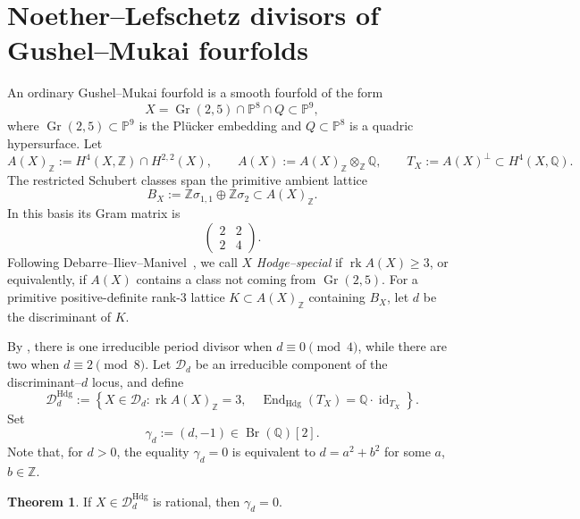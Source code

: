 \documentclass[10pt]{amsart}
\numberwithin{equation}{section}
\theoremstyle{definition}
\newtheorem{theorem}{Theorem}[section]
\theoremstyle{plain}
\numberwithin{theorem}{section}
\def\PP{{\mathbb{P}}}
\def\ZZ{{\mathbb{Z}}}
\newcommand{\Q}{\mathbb{Q}}
\newcommand{\Z}{\mathbb{Z}}
\newcommand{\Gr}{\operatorname{Gr}}
\begin{document}
\section{Noether--Lefschetz divisors of Gushel--Mukai fourfolds} 
An ordinary Gushel--Mukai fourfold is a smooth fourfold of the form
\[
X=\Gr(2,5)\cap\PP^8\cap Q\subset\PP^9,
\]
where $\Gr(2,5)\subset\PP^9$ is the Pl\"ucker embedding and
$Q\subset\PP^8$ is a quadric hypersurface. Let
\[
A(X)_\Z:=H^4(X,\Z)\cap H^{2,2}(X),
\qquad
A(X) := A(X)_\ZZ \otimes_{\Z} \Q, \qquad
T_X:=A(X)^{\perp}\subset H^4(X,\Q).
\]
The restricted Schubert classes span the primitive ambient lattice
\[
B_X:=\Z\sigma_{1,1}\oplus\Z\sigma_2\subset A(X)_\Z.
\]
In this basis its Gram matrix is
\[
\begin{pmatrix}
2&2\\
2&4
\end{pmatrix}.
\]
Following Debarre--Iliev--Manivel~\cite{debarre2015special}, we call $X$ \emph{Hodge--special} if
$\operatorname{rk}A(X)\geq 3$, or equivalently, if $A(X)$ contains a
class not coming from $\operatorname{Gr}(2,5)$. For a primitive positive-definite rank-$3$ lattice
$K\subset A(X)_\Z$ containing $B_X$, let $d$ be the discriminant of $K$.

By \cite[Corollary~6.3]{debarre2015special}, there is one
irreducible period divisor when $d\equiv0\pmod4$, while there are two when $d\equiv2\pmod8$. 
Let $\mathcal D_d$ be an irreducible component of the
discriminant--$d$ locus, and define
\[
\mathcal D_d^{\mathrm{Hdg}}
:=
\left\{
X\in\mathcal D_d:
\operatorname{rk}A(X)_{\Z}=3,\quad
\operatorname{End}_{\mathrm{Hdg}}(T_X)
=\Q\cdot\operatorname{id}_{T_X}
\right\}.
\]
Set
\[
\gamma_d:=(d,-1)\in\operatorname{Br}(\Q)[2].
\]
Note that, for $d>0$, the equality $\gamma_d=0$ is equivalent to $d=a^2+b^2$ for some $a$,~$    b\in\Z$.  

\begin{theorem}\label{thm:gm}
If $X\in\mathcal D_d^{\mathrm{Hdg}}$ is rational, then $\gamma_d=0$.
\end{theorem}
\end{document}
